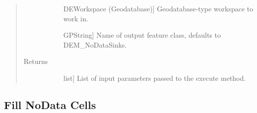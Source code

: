 \documentclass[letterpaper,10pt,english]{sphinxmanual}
\begin{document}
\begin{fulllineitems}
\begin{fulllineitems}
\begin{quote}
\begin{description}
\begin{description}
\item[{}] \leavevmode{[}DEWorkspace (Geodatabase){]}
Geodatabase-type workspace to work in.

\item[{}] \leavevmode{[}GPString{]}
Name of output feature class, defaults to DEM\_NoDataSinks.

\end{description}

\item[{Returns}] \leavevmode\begin{description}
\item[{}] \leavevmode{[}list{]}
List of input parameters passed to the execute method.

\end{description}

\end{description}\end{quote}

\end{fulllineitems}


\end{fulllineitems}



\subsection{Fill NoData Cells}
\label{\detokenize{StreamStats_DataPrep:fill-nodata-cells}}
\end{document}
